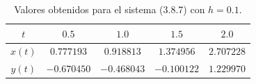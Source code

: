 \begin{table}[htbp]
    \centering
    \caption{Valores obtenidos para el sistema (3.8.7) con $h = 0.1$.}
    \label{tab:prob9_sistema}
    \renewcommand{\arraystretch}{1.25}
    \begin{tabular}{ccccc}
        \toprule
        $t$ & $0.5$ & $1.0$ & $1.5$ & $2.0$ \\
        \midrule
        $x(t)$ & $0.777193$  & $0.918813$  & $1.374956$  & $2.707228$ \\
        $y(t)$ & $-0.670450$ & $-0.468043$ & $-0.100122$ & $1.229970$ \\
        \bottomrule
    \end{tabular}
\end{table}
\vfill
\newpage